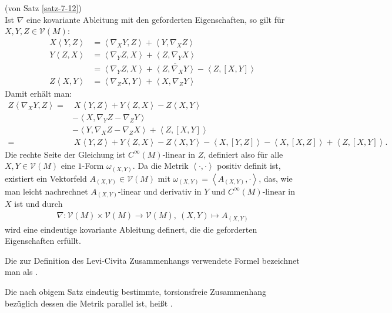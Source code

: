 \begin{bew}(von Satz \ref{satz-7-12})\\
  Ist $\nabla$ eine kovariante Ableitung mit den geforderten Eigenschaften, so gilt für $X,Y,Z \in \mathcal V(M)$:
  \begin{align*}
    X\left<Y,Z\right> & = \left<\nabla_XY,Z\right> + \left<Y,\nabla_XZ\right>\\
    Y\left<Z,X\right> & = \left<\nabla_YZ,X\right> + \left<Z,\nabla_YX\right>\\
    & = \left<\nabla_YZ,X\right> + \overline{\left<Z,\nabla_XY\right>} - \left<Z,[X,Y]\right>\\
    Z\left<X,Y\right> & = \left<\nabla_ZX,Y \right> + \left<X,\nabla_ZY\right>
  \end{align*}
  Damit erhält man:
  \begin{align*}
    Z\left<\nabla_XY,Z\right> = & \ X \left<Y,Z\right> + Y\left<Z,X\right> - Z\left<X,Y\right>\\
    & - \left<X,\nabla_YZ - \nabla_ZY\right> \\
    & - \left<Y,\nabla_XZ - \nabla_ZX\right> + \left<Z,[X,Y]\right>\\
    = & \ X\left<Y,Z\right> + Y\left<Z,X\right> - Z\left<X,Y\right> - \left<X,[Y,Z]\right> - \left<X,[X,Z]\right> + \left<Z,[X,Y]\right>.
  \end{align*}
  Die rechte Seite der Gleichung ist $C^{\infty}(M)$-linear in $Z$, definiert also für alle $X,Y \in \mathcal V(M)$ eine $1$-Form $\omega_{(X,Y)}$.
  Da die Metrik $\left<\cdot,\cdot\right>$ positiv definit ist, existiert ein Vektorfeld $A_{(X,Y)} \in \mathcal V(M)$ mit $\omega_{(X,Y)} = \left<A_{(X,Y)},\cdot\right>$, das, wie man leicht nachrechnet $A_{(X,Y)}$-linear und derivativ in $Y$ und $C^{\infty}(M)$-linear in $X$ ist und durch
  \begin{align*}
    \nabla \colon \mathcal V(M) \times \mathcal V(M) \to \mathcal V(M), \ (X,Y) \mapsto A_{(X,Y)}
  \end{align*}
  wird eine eindeutige kovariante Ableitung definert, die die geforderten Eigenschaften erfüllt.
\end{bew}

\begin{bem}
  Die zur Definition des Levi-Civita Zusammenhangs verwendete Formel bezeichnet man als .
\end{bem}

\begin{Dfn}
  Die nach obigem Satz eindeutig bestimmte, torsionsfreie Zusammenhang bezüglich dessen die Metrik parallel ist, heißt .
\end{Dfn}

